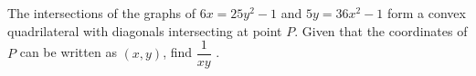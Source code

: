 The intersections of the graphs of $6x = 25y^2 - 1$ and $5y = 36x^2 - 1$ form a convex quadrilateral with diagonals intersecting at point $P$. Given that the coordinates of $P$ can be written as $(x, y)$, find $\dfrac{1}{xy}$ .
